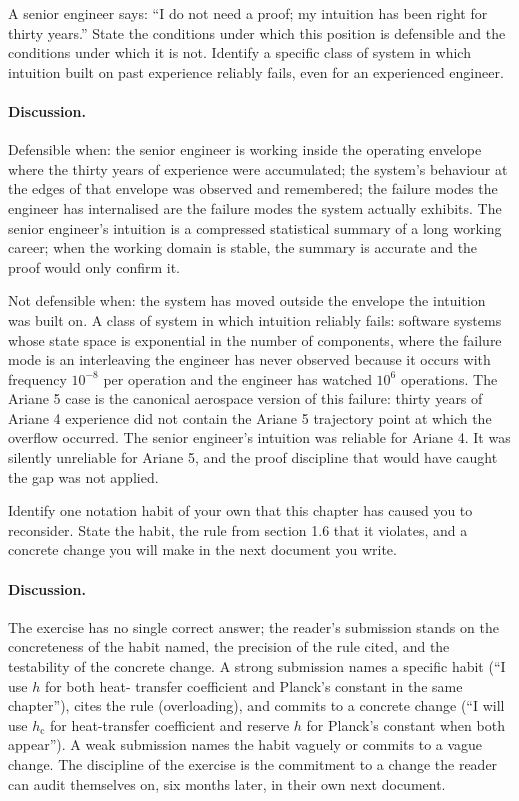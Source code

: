 \begin{exercise}
A senior engineer says: ``I do not need a proof; my intuition has
been right for thirty years.'' State the conditions under which
this position is defensible and the conditions under which it is
not. Identify a specific class of system in which intuition built
on past experience reliably fails, even for an experienced engineer.

\paragraph{Discussion.}
Defensible when: the senior engineer is working inside the operating
envelope where the thirty years of experience were accumulated; the
system's behaviour at the edges of that envelope was observed and
remembered; the failure modes the engineer has internalised are the
failure modes the system actually exhibits. The senior engineer's
intuition is a compressed statistical summary of a long working
career; when the working domain is stable, the summary is accurate
and the proof would only confirm it.

Not defensible when: the system has moved outside the envelope the
intuition was built on. A class of system in which intuition
reliably fails: software systems whose state space is exponential in
the number of components, where the failure mode is an interleaving
the engineer has never observed because it occurs with frequency
$10^{-8}$ per operation and the engineer has watched $10^{6}$
operations. The Ariane 5 case is the canonical aerospace version of
this failure: thirty years of Ariane 4 experience did not contain
the Ariane 5 trajectory point at which the overflow occurred. The
senior engineer's intuition was reliable for Ariane 4. It was
silently unreliable for Ariane 5, and the proof discipline that
would have caught the gap was not applied.
\end{exercise}

\begin{exercise}
Identify one notation habit of your own that this chapter has
caused you to reconsider. State the habit, the rule from section
1.6 that it violates, and a concrete change you will make in the
next document you write.

\paragraph{Discussion.}
The exercise has no single correct answer; the reader's submission
stands on the concreteness of the habit named, the precision of the
rule cited, and the testability of the concrete change. A strong
submission names a specific habit (``I use $h$ for both heat-
transfer coefficient and Planck's constant in the same chapter''),
cites the rule (overloading), and commits to a concrete change
(``I will use $h_{\text{c}}$ for heat-transfer coefficient and
reserve $h$ for Planck's constant when both appear''). A weak
submission names the habit vaguely or commits to a vague change.
The discipline of the exercise is the commitment to a change the
reader can audit themselves on, six months later, in their own
next document.
\end{exercise}
